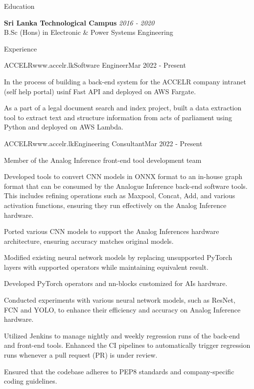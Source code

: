 \documentclass[
	11pt, %
]{./assets/resume} %
\begin{document}
\begin{rSection}{Education}

	\textbf{Sri Lanka Technological Campus} \hfill \textit{2016 - 2020} \\ 
    B.Sc (Hons) in Electronic \& Power Systems Engineering \\
	
\end{rSection}


\begin{rSection}{Experience}

	\begin{rSubsectionX}{ACCELR}{www.accelr.lk}{Software Engineer}{Mar 2022 - Present}
        \item In the process of building a back-end system for the ACCELR company intranet (self help portal) usinf Fast API and deployed on AWS Fargate.
        \item As a part of a legal document search and index project, built a data extraction tool to extract text and structure information from acts of parliament using Python and deployed on AWS Lambda.
	\end{rSubsectionX}

	\begin{rSubsectionX}{ACCELR}{www.accelr.lk}{Engineering Consultant}{Mar 2022 - Present}
		\item Member of the Analog Inference front-end tool development team
        \item Developed tools to convert CNN models in ONNX format to an in-house graph format that can be consumed by the Analogue Inference back-end software tools. This includes refining operations such as Maxpool, Concat, Add, and various activation functions, ensuring they run effectively on the Analog Inference hardware.
        \item Ported various CNN models to support the Analog Inferences hardware architecture, ensuring accuracy matches original models.
        \item Modified existing neural network models by replacing unsupported PyTorch layers with supported operators while maintaining equivalent result.
        \item Developed PyTorch operators and nn-blocks customized for AIs hardware.
        \item Conducted experiments with various neural network models, such as ResNet, FCN and YOLO, to enhance their efficiency and accuracy on Analog Inference hardware.
        \item Utilized Jenkins to manage nightly and weekly regression runs of the back-end and front-end tools. Enhanced the CI pipelines to automatically trigger regression runs whenever a pull request (PR) is under review.
        \item Ensured that the codebase adheres to PEP8 standards and company-specific coding guidelines.
	\end{rSubsectionX}


\end{rSection}
\end{document}
